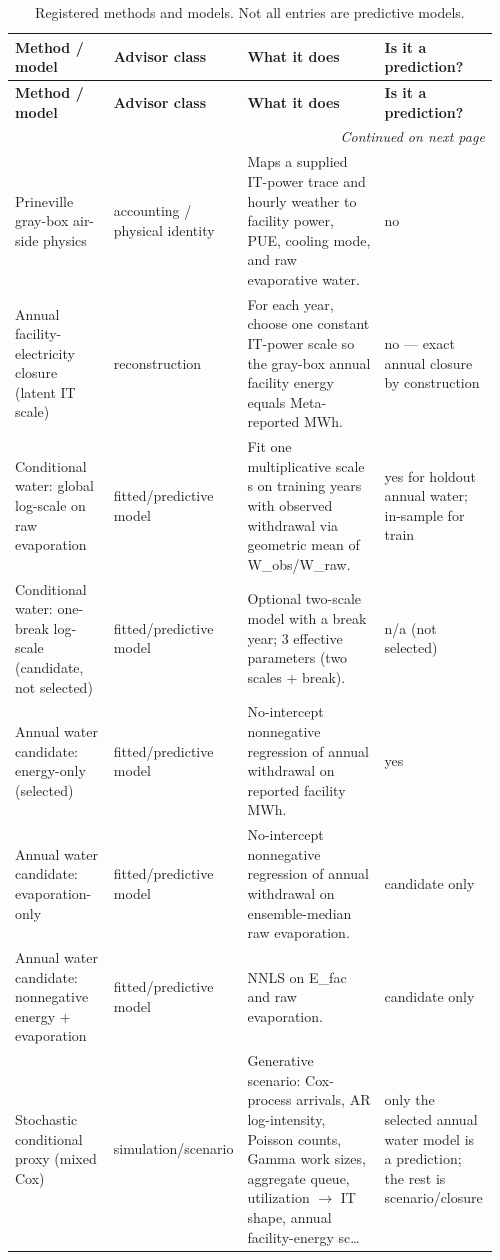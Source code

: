 \documentclass[11pt]{article}
\begin{document}
\begingroup
\footnotesize
\setlength{\tabcolsep}{3.5pt}
\begin{longtable}{@{}p{0.22\linewidth}p{0.18\linewidth}p{0.32\linewidth}p{0.24\linewidth}@{}}
\caption{Registered methods and models. Not all entries are predictive models.}\\
\toprule
\textbf{Method / model} & \textbf{Advisor class} & \textbf{What it does} & \textbf{Is it a prediction?} \\
\midrule
\endfirsthead
\toprule
\textbf{Method / model} & \textbf{Advisor class} & \textbf{What it does} & \textbf{Is it a prediction?} \\
\midrule
\endhead
\midrule
\multicolumn{4}{r}{\emph{Continued on next page}}\\
\endfoot
\bottomrule
\endlastfoot
Prineville gray-box air-side physics & accounting / physical identity & Maps a supplied IT-power trace and hourly weather to facility power, PUE, cooling mode, and raw evaporative water. & no\\
Annual facility-electricity closure (latent IT scale) & reconstruction & For each year, choose one constant IT-power scale so the gray-box annual facility energy equals Meta-reported MWh. & no --- exact annual closure by construction\\
Conditional water: global log-scale on raw evaporation & fitted/predictive model & Fit one multiplicative scale s on training years with observed withdrawal via geometric mean of W\_obs/W\_raw. & yes for holdout annual water; in-sample for train\\
Conditional water: one-break log-scale (candidate, not selected) & fitted/predictive model & Optional two-scale model with a break year; 3 effective parameters (two scales + break). & n/a (not selected)\\
Annual water candidate: energy-only (selected) & fitted/predictive model & No-intercept nonnegative regression of annual withdrawal on reported facility MWh. & yes\\
Annual water candidate: evaporation-only & fitted/predictive model & No-intercept nonnegative regression of annual withdrawal on ensemble-median raw evaporation. & candidate only\\
Annual water candidate: nonnegative energy + evaporation & fitted/predictive model & NNLS on E\_fac and raw evaporation. & candidate only\\
Stochastic conditional proxy (mixed Cox) & simulation/scenario & Generative scenario: Cox-process arrivals, AR log-intensity, Poisson counts, Gamma work sizes, aggregate queue, utilization $\to$ IT shape, annual facility-energy sc\ldots & only the selected annual water model is a prediction; the rest is scenario/closure\\

\end{longtable}
\end{document}

